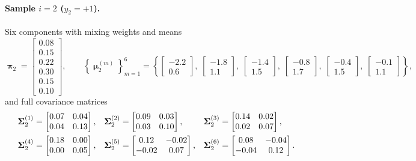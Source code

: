 \documentclass[11pt, letterpaper]{article}
\newcommand{\bSigma}{\vb{\Sigma}}
\newcommand{\bpi}{\boldsymbol{\uppi}}
\newcommand{\bmu}{\boldsymbol{\upmu}}
\begin{document}
\paragraph{Sample $i = 2$ ($y_2 = +1$).} Six components with mixing weights and means
\begin{equation}
    \bpi_2 = \begin{bmatrix} 0.08 \\ 0.15 \\ 0.22 \\ 0.30 \\ 0.15 \\ 0.10 \end{bmatrix},
    \qquad
    \left\{\bmu_2^{(m)}\right\}_{m=1}^{6} =
    \left\{
        \begin{bmatrix} -2.2 \\  0.6 \end{bmatrix},\;
        \begin{bmatrix} -1.8 \\  1.1 \end{bmatrix},\;
        \begin{bmatrix} -1.4 \\  1.5 \end{bmatrix},\;
        \begin{bmatrix} -0.8 \\  1.7 \end{bmatrix},\;
        \begin{bmatrix} -0.4 \\  1.5 \end{bmatrix},\;
        \begin{bmatrix} -0.1 \\  1.1 \end{bmatrix}
    \right\},
\end{equation}
and full covariance matrices
\begin{align}
    \bSigma_2^{(1)} &= \begin{bmatrix} 0.07 & 0.04 \\ 0.04 & 0.13 \end{bmatrix}, &
    \bSigma_2^{(2)} &= \begin{bmatrix} 0.09 & 0.03 \\ 0.03 & 0.10 \end{bmatrix}, &
    \bSigma_2^{(3)} &= \begin{bmatrix} 0.14 & 0.02 \\ 0.02 & 0.07 \end{bmatrix}, \notag \\
    \bSigma_2^{(4)} &= \begin{bmatrix} 0.18 & 0.00 \\ 0.00 & 0.05 \end{bmatrix}, &
    \bSigma_2^{(5)} &= \begin{bmatrix} 0.12 & -0.02 \\ -0.02 & 0.07 \end{bmatrix}, &
    \bSigma_2^{(6)} &= \begin{bmatrix} 0.08 & -0.04 \\ -0.04 & 0.12 \end{bmatrix}.
\end{align}
\end{document}

